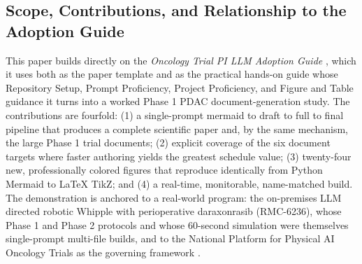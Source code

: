 \subsection{Scope, Contributions, and Relationship to the Adoption Guide}

This paper builds directly on the \emph{Oncology Trial PI LLM Adoption Guide}
\cite{adoptionguide}, which it uses both as the paper template and as the practical
hands-on guide whose Repository Setup, Prompt Proficiency, Project Proficiency, and
Figure and Table guidance it turns into a worked Phase 1 PDAC document-generation
study. The contributions are fourfold: (1) a single-prompt mermaid to draft to full
to final pipeline that produces a complete scientific paper and, by the same
mechanism, the large Phase 1 trial documents; (2) explicit coverage of the six
document targets where faster authoring yields the greatest schedule value; (3)
twenty-four new, professionally colored figures that reproduce identically from
Python Mermaid to LaTeX TikZ; and (4) a real-time, monitorable, name-matched build.
The demonstration is anchored to a real-world program: the on-premises LLM directed
robotic Whipple with perioperative daraxonrasib (RMC-6236), whose Phase 1
\cite{phase1protocol} and Phase 2 \cite{phase2protocol} protocols and whose
60-second simulation \cite{kawchak_2026_20196639} were themselves single-prompt
multi-file builds, and to the National Platform for Physical AI Oncology Trials as
the governing framework \cite{natplatform}.
